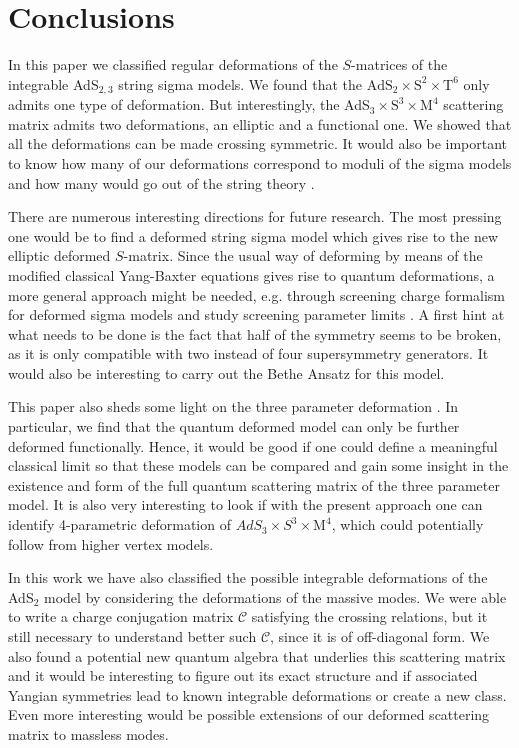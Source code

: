 \documentclass[12pt,a4paper]{article}
\numberwithin{equation}{section}
\begin{document}
\section{Conclusions}

In this paper we classified regular deformations of the $S$-matrices of the integrable AdS$_{2,3}$ string sigma models. We found that the $\mathrm{AdS}_2 \times \mathrm{S}^2 \times \mathrm{T}^6$ only admits one type of deformation. But interestingly, the AdS$_3 \times \mathrm{S}^3 \times \mathrm{M}^4$ scattering matrix admits two deformations, an elliptic and a functional one. We showed that all the deformations can be made crossing symmetric. It would also be important to know how many of our deformations correspond to moduli of the sigma models and how many would go out of the string theory \cite{OhlssonSax:2018hgc}.

There are numerous interesting directions for future research. The most pressing one would be to find a deformed string sigma model which gives rise to the new elliptic deformed $S$-matrix. Since the usual way of deforming by means of the modified classical Yang-Baxter equations gives rise to quantum deformations, a more general approach might be needed, e.g. through screening charge formalism for deformed sigma models and study screening parameter limits \cite{OSP_Sigma_2020}. A first hint at what needs to be done is the fact that half of the symmetry seems to be broken, as it is only compatible with two instead of four supersymmetry generators. It would also be interesting to carry out the Bethe Ansatz for this model.

This paper also sheds some light on the three parameter deformation \cite{Delduc:2018xug,Bocconcello:2020qkt}. In particular, we find that the quantum deformed model can only be further deformed functionally. Hence, it would be good if one could define a meaningful classical limit so that these models can be compared and gain some insight in the existence and form of the full quantum scattering matrix of the three parameter model. It is also very interesting to look if with the present approach one can identify 4-parametric deformation of $ AdS_{3}\times S^{3}\times \mathrm{M}^{4} $, which could potentially follow from higher vertex models.

In this work we have also classified the possible integrable deformations of the AdS$_{2}$ model by considering the deformations of the massive modes. We were able to write a charge conjugation matrix $\mathcal{C}  $ satisfying the crossing relations, but it still necessary to understand better such $ \mathcal{C} $, since it is of off-diagonal form. We also found a potential new quantum algebra that underlies this scattering matrix and it would be interesting to figure out its exact structure and if associated Yangian symmetries lead to known integrable deformations or create a new class.  Even more interesting would be possible extensions of our deformed scattering matrix to massless modes. 
\end{document}
